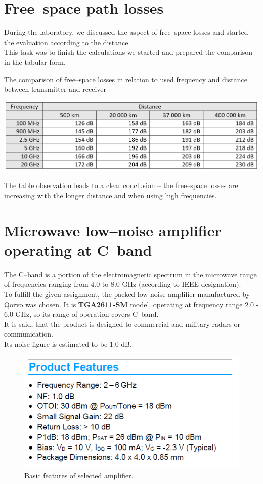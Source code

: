 \documentclass[a4paper, 11pt]{report}
\begin{document}
\section{Free--space path losses}
During the laboratory, we discussed the aspect of free--space losses and started the evaluation according to the distance.\\
This task was to finish the calculations we started and prepared the comparison in the tabular form.

\begin{table}[h]
	\centering
	\caption{The comparison of free--space losses in relation to used frequency and distance between transmitter and receiver}
	\includegraphics[width=0.9\linewidth]{freespace}
	\label{fig:freespace}
\end{table}
\noindent
The table observation leads to a clear conclusion -- the free--space losses are increasing with the longer distance and when using high frequencies.
\newpage
\section{Microwave low--noise amplifier operating at C--band}

The C--band is a portion of the electromagnetic spectrum in the microwave range of frequencies ranging from 4.0 to 8.0 GHz (according to IEEE designation).\\
To fulfill the given assignment, the packed low noise amplifier manufactured by Qorvo was chosen. It is \textbf{TGA2611-SM} model, operating at frequency range 2.0 - 6.0 GHz, so its range of operation covers C--band.
\\
It is said, that the product is designed to commercial and military radars or communication.\\
Its noise figure is estimated to be 1.0 dB.
\begin{figure}[h]
	\centering
	\includegraphics[width=0.3\linewidth]{chip}
	\caption{Basic features of selected amplifier.}
	\label{fig:chip}
\end{figure}
\end{document}

